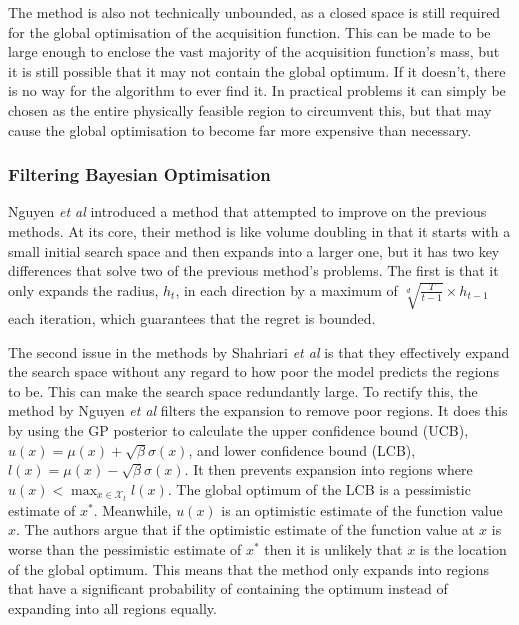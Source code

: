 \documentclass[preprint]{elsarticle}
\begin{document}
The method is also not technically unbounded, as a closed space is still required for the global optimisation of the acquisition function. This can be made to be large enough to enclose the vast majority of the acquisition function's mass, but it is still possible that it may not contain the global optimum. If it doesn't, there is no way for the algorithm to ever find it. In practical problems it can simply be chosen as the entire physically feasible region to circumvent this, but that may cause the global optimisation to become far more expensive than necessary.


\subsubsection{Filtering Bayesian Optimisation}
Nguyen \emph{et al} \cite{nguyen2018filtering,nguyen2017bayesian} introduced a method that attempted to improve on the previous methods. At its core, their method is like volume doubling in that it starts with a small initial search space and then expands into a larger one, but it has two key differences that solve two of the previous method's problems. The first is that it only expands the radius, $h_t$, in each direction by a maximum of $\sqrt[d]{\frac{T}{t-1}}\times h_{t-1}$ each iteration, which guarantees that the regret is bounded.

The second issue in the methods by Shahriari \emph{et al} is that they effectively expand the search space without any regard to how poor the model predicts the regions to be. This can make the search space redundantly large. To rectify this, the method by Nguyen \emph{et al} filters the expansion to remove poor regions. It does this by using the GP posterior to calculate the upper confidence bound (UCB), $u(x)=\mu(x)+\sqrt{\beta}\sigma(x)$, and lower confidence bound (LCB), $l(x)=\mu(x)-\sqrt{\beta}\sigma(x)$. It then prevents expansion into regions where $u(x)<\max_{x\in \mathcal{X}_t}l(x)$. The global optimum of the LCB is a pessimistic estimate of $x^*$. Meanwhile, $u(x)$ is an optimistic estimate of the function value $x$. The authors argue that if the optimistic estimate of the function value at $x$ is worse than the pessimistic estimate of $x^*$ then it is unlikely that $x$ is the location of the global optimum. This means that the method only expands into regions that have a significant probability of containing the optimum instead of expanding into all regions equally.
\end{document}
